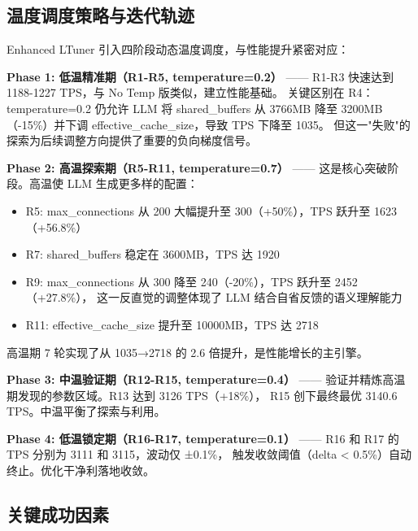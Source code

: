 \subsection{温度调度策略与迭代轨迹}

Enhanced LTuner 引入四阶段动态温度调度，与性能提升紧密对应：

\textbf{Phase 1: 低温精准期（R1-R5, temperature=0.2）}
—— R1-R3 快速达到 1188-1227 TPS，与 No Temp 版类似，建立性能基础。
关键区别在 R4：temperature=0.2 仍允许 LLM 将 shared\_buffers 从 3766MB
降至 3200MB（-15\%）并下调 effective\_cache\_size，导致 TPS 下降至 1035。
但这一"失败"的探索为后续调整方向提供了重要的负向梯度信号。

\textbf{Phase 2: 高温探索期（R5-R11, temperature=0.7）}
—— 这是核心突破阶段。高温使 LLM 生成更多样的配置：
\begin{itemize}
  \item R5: max\_connections 从 200 大幅提升至 300（+50\%），TPS 跃升至 1623（+56.8\%）
  \item R7: shared\_buffers 稳定在 3600MB，TPS 达 1920
  \item R9: max\_connections 从 300 降至 240（-20\%），TPS 跃升至 2452（+27.8\%），
        这一反直觉的调整体现了 LLM 结合自省反馈的语义理解能力
  \item R11: effective\_cache\_size 提升至 10000MB，TPS 达 2718
\end{itemize}
高温期 7 轮实现了从 1035→2718 的 2.6 倍提升，是性能增长的主引擎。

\textbf{Phase 3: 中温验证期（R12-R15, temperature=0.4）}
—— 验证并精炼高温期发现的参数区域。R13 达到 3126 TPS（+18\%），
R15 创下最终最优 3140.6 TPS。中温平衡了探索与利用。

\textbf{Phase 4: 低温锁定期（R16-R17, temperature=0.1）}
—— R16 和 R17 的 TPS 分别为 3111 和 3115，波动仅 ±0.1\%，
触发收敛阈值（delta < 0.5\%）自动终止。优化干净利落地收敛。

\subsection{关键成功因素}

